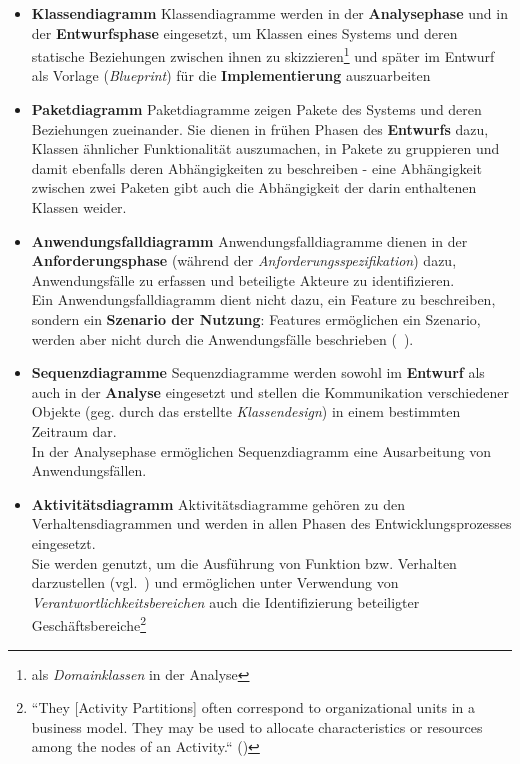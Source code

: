 \begin{itemize}
    \item \textbf{Klassendiagramm} Klassendiagramme werden in der \textbf{Analysephase} und in der \textbf{Entwurfsphase} eingesetzt, um Klassen eines Systems und deren statische Beziehungen zwischen ihnen zu skizzieren\footnote{als \textit{Domainklassen} in der Analyse} und später im Entwurf als Vorlage (\textit{Blueprint}) für die \textbf{Implementierung} auszuarbeiten
    \item \textbf{Paketdiagramm} Paketdiagramme zeigen Pakete des Systems und deren Beziehungen zueinander.
    Sie dienen in frühen Phasen des \textbf{Entwurfs} dazu,  Klassen ähnlicher Funktionalität auszumachen, in Pakete zu gruppieren und damit ebenfalls deren Abhängigkeiten zu beschreiben - eine Abhängigkeit zwischen zwei Paketen gibt auch die Abhängigkeit der darin enthaltenen Klassen weider.
    \item \textbf{Anwendungsfalldiagramm}
    Anwendungsfalldiagramme dienen in der \textbf{Anforderungsphase} (während der \textit{Anforderungsspezifikation}) dazu, Anwendungsfälle zu erfassen und beteiligte Akteure zu identifizieren.\\
     Ein Anwendungsfalldiagramm dient nicht dazu, ein Feature zu beschreiben, sondern ein \textbf{Szenario der Nutzung}: Features ermöglichen ein Szenario, werden aber nicht durch die Anwendungsfälle beschrieben (~\cite[52]{Buh09}).
    \item \textbf{Sequenzdiagramme} Sequenzdiagramme werden sowohl im \textbf{Entwurf} als auch in der \textbf{Analyse} eingesetzt und stellen die Kommunikation verschiedener Objekte (geg. durch das erstellte \textit{Klassendesign}) in einem bestimmten Zeitraum dar.\\
    In der Analysephase ermöglichen Sequenzdiagramm eine Ausarbeitung von Anwendungsfällen.
    \item \textbf{Aktivitätsdiagramm}  Aktivitätsdiagramme gehören zu den Verhaltensdiagrammen und werden in allen Phasen des Entwicklungsprozesses eingesetzt.\\
    Sie werden genutzt, um die Ausführung von Funktion bzw. Verhalten darzustellen (vgl.~\cite[69]{Bal05}) und ermöglichen unter Verwendung von \textit{Verantwortlichkeitsbereichen} auch die Identifizierung beteiligter Geschäftsbereiche\footnote{
    ``They [Activity Partitions] often correspond to organizational units in a business model. They
    may be used to allocate characteristics or resources among the nodes of an Activity.`` (\cite[406]{OMG17})
}
\end{itemize}
